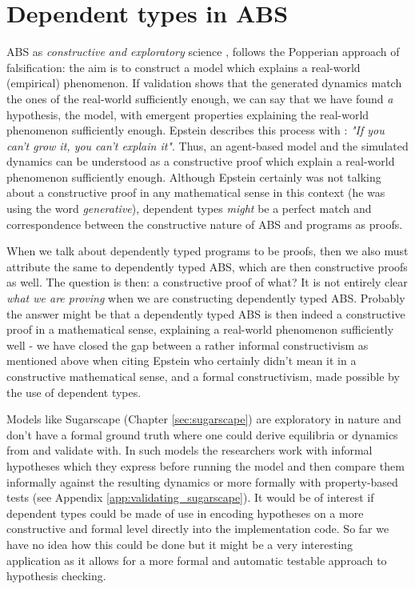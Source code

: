 \section{Dependent types in ABS}
\label{sec:dep_vav_deptypes}
ABS as \textit{constructive and exploratory} science \cite{epstein_chapter_2006, epstein_generative_2012}, follows the Popperian approach of falsification: the aim is to construct a model which explains a real-world (empirical) phenomenon. If validation shows that the generated dynamics match the ones of the real-world sufficiently enough, we can say that we have found \textit{a} hypothesis, the model, with emergent properties explaining the real-world phenomenon sufficiently enough. %
Epstein describes this process with \cite{epstein_chapter_2006}: \textit{"If you can't grow it, you can't explain it"}. Thus, an agent-based model and the simulated dynamics can be understood as a constructive proof which explain a real-world phenomenon sufficiently enough. Although Epstein certainly was not talking about a constructive proof in any mathematical sense in this context (he was using the word \textit{generative}), dependent types \textit{might} be a perfect match and correspondence between the constructive nature of ABS and programs as proofs.

When we talk about dependently typed programs to be proofs, then we also must attribute the same to dependently typed ABS, which are then constructive proofs as well. The question is then: a constructive proof of what? It is not entirely clear \textit{what we are proving} when we are constructing dependently typed ABS. Probably the answer might be that a dependently typed ABS is then indeed a constructive proof in a mathematical sense, explaining a real-world phenomenon sufficiently well - we have closed the gap between a rather informal constructivism as mentioned above when citing Epstein who certainly didn't mean it in a constructive mathematical sense, and a formal constructivism, made possible by the use of dependent types.

\medskip

Models like Sugarscape (Chapter \ref{sec:sugarscape}) are exploratory in nature and don't have a formal ground truth where one could derive equilibria or dynamics from and validate with. In such models the researchers work with informal hypotheses which they express before running the model and then compare them informally against the resulting dynamics or more formally with property-based tests (see Appendix \ref{app:validating_sugarscape}). It would be of interest if dependent types could be made of use in encoding hypotheses on a more constructive and formal level directly into the implementation code. So far we have no idea how this could be done but it might be a very interesting application as it allows for a more formal and automatic testable approach to hypothesis checking.

